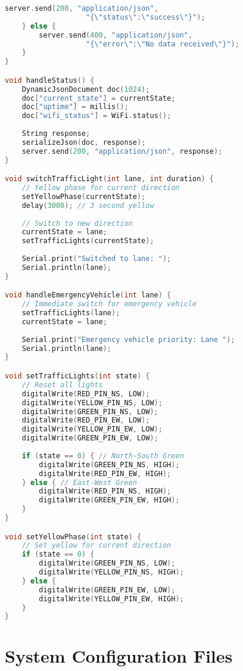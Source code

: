 \begin{lstlisting}[language=C++, caption=Arduino Traffic Light Control]
        server.send(200, "application/json", 
                   "{\"status\":\"success\"}");
    } else {
        server.send(400, "application/json", 
                   "{\"error\":\"No data received\"}");
    }
}

void handleStatus() {
    DynamicJsonDocument doc(1024);
    doc["current_state"] = currentState;
    doc["uptime"] = millis();
    doc["wifi_status"] = WiFi.status();
    
    String response;
    serializeJson(doc, response);
    server.send(200, "application/json", response);
}

void switchTrafficLight(int lane, int duration) {
    // Yellow phase for current direction
    setYellowPhase(currentState);
    delay(3000); // 3 second yellow
    
    // Switch to new direction
    currentState = lane;
    setTrafficLights(currentState);
    
    Serial.print("Switched to lane: ");
    Serial.println(lane);
}

void handleEmergencyVehicle(int lane) {
    // Immediate switch for emergency vehicle
    setTrafficLights(lane);
    currentState = lane;
    
    Serial.print("Emergency vehicle priority: Lane ");
    Serial.println(lane);
}

void setTrafficLights(int state) {
    // Reset all lights
    digitalWrite(RED_PIN_NS, LOW);
    digitalWrite(YELLOW_PIN_NS, LOW);
    digitalWrite(GREEN_PIN_NS, LOW);
    digitalWrite(RED_PIN_EW, LOW);
    digitalWrite(YELLOW_PIN_EW, LOW);
    digitalWrite(GREEN_PIN_EW, LOW);
    
    if (state == 0) { // North-South Green
        digitalWrite(GREEN_PIN_NS, HIGH);
        digitalWrite(RED_PIN_EW, HIGH);
    } else { // East-West Green
        digitalWrite(RED_PIN_NS, HIGH);
        digitalWrite(GREEN_PIN_EW, HIGH);
    }
}

void setYellowPhase(int state) {
    // Set yellow for current direction
    if (state == 0) {
        digitalWrite(GREEN_PIN_NS, LOW);
        digitalWrite(YELLOW_PIN_NS, HIGH);
    } else {
        digitalWrite(GREEN_PIN_EW, LOW);
        digitalWrite(YELLOW_PIN_EW, HIGH);
    }
}
\end{lstlisting}

\section{System Configuration Files}
\label{app:config_files}

